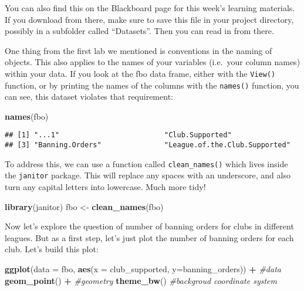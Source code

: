 \documentclass[
]{book}
\newenvironment{Shaded}{\begin{snugshade}}{\end{snugshade}}
\newcommand{\AttributeTok}[1]{\textcolor[rgb]{0.13,0.29,0.53}{#1}}
\newcommand{\CommentTok}[1]{\textcolor[rgb]{0.56,0.35,0.01}{\textit{#1}}}
\newcommand{\FunctionTok}[1]{\textcolor[rgb]{0.13,0.29,0.53}{\textbf{#1}}}
\newcommand{\NormalTok}[1]{#1}
\newcommand{\OtherTok}[1]{\textcolor[rgb]{0.56,0.35,0.01}{#1}}
\newcommand{\SpecialCharTok}[1]{\textcolor[rgb]{0.81,0.36,0.00}{\textbf{#1}}}
\begin{document}
You can also find this on the Blackboard page for this week's learning materials. If you download from there, make sure to save this file in your project directory, possibly in a subfolder called ``Datasets''. Then you can read in from there.

One thing from the first lab we mentioned is conventions in the naming of objects. This also applies to the names of your variables (i.e.~your column names) within your data. If you look at the fbo data frame, either with the \texttt{View()} function, or by printing the names of the columns with the \texttt{names()} function, you can see, this dataset violates that requirement:

\begin{Shaded}
\begin{Highlighting}[]
\FunctionTok{names}\NormalTok{(fbo)}
\end{Highlighting}
\end{Shaded}

\begin{verbatim}
## [1] "...1"                         "Club.Supported"              
## [3] "Banning.Orders"               "League.of.the.Club.Supported"
\end{verbatim}

To address this, we can use a function called \texttt{clean\_names()} which lives inside the \texttt{janitor} package. This will replace any spaces with an underscore, and also turn any capital letters into lowercase. Much more tidy!

\begin{Shaded}
\begin{Highlighting}[]
\FunctionTok{library}\NormalTok{(janitor)}
\NormalTok{fbo }\OtherTok{\textless{}{-}} \FunctionTok{clean\_names}\NormalTok{(fbo)}
\end{Highlighting}
\end{Shaded}

Now let's explore the question of number of banning orders for clubs in different leagues. But as a first step, let's just plot the number of banning orders for each club. Let's build this plot:

\begin{Shaded}
\begin{Highlighting}[]
\FunctionTok{ggplot}\NormalTok{(}\AttributeTok{data =}\NormalTok{ fbo, }\FunctionTok{aes}\NormalTok{(}\AttributeTok{x =}\NormalTok{ club\_supported, }\AttributeTok{y=}\NormalTok{banning\_orders)) }\SpecialCharTok{+} \CommentTok{\#data}
   \FunctionTok{geom\_point}\NormalTok{() }\SpecialCharTok{+}                 \CommentTok{\#geometry}
  \FunctionTok{theme\_bw}\NormalTok{()                     }\CommentTok{\#backgroud coordinate system}
\end{Highlighting}
\end{Shaded}
\end{document}
